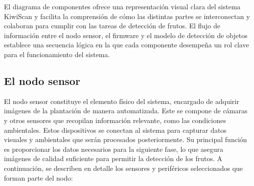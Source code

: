 \vspace{1cm}

El diagrama de componentes ofrece una representación visual clara del sistema KiwiScan y facilita la comprensión de cómo las distintas partes se interconectan y colaboran para cumplir con las tareas de detección de frutos. El flujo de información entre el nodo sensor, el firmware y el modelo de detección de objetos establece una secuencia lógica en la que cada componente desempeña un rol clave para el funcionamiento del sistema.

\subsection{El nodo sensor}

El nodo sensor constituye el elemento físico del sistema, encargado de adquirir imágenes de la plantación de manera automatizada. Este se compone de cámaras y otros sensores que recopilan información relevante, como las condiciones ambientales. Estos dispositivos se conectan al sistema para capturar datos visuales y ambientales que serán procesados posteriormente. Su principal función es proporcionar los datos necesarios para la siguiente fase, lo que asegura imágenes de calidad suficiente para permitir la detección de los frutos. A continuación, se describen en detalle los sensores y periféricos seleccionados que forman parte del nodo:

\newpage

